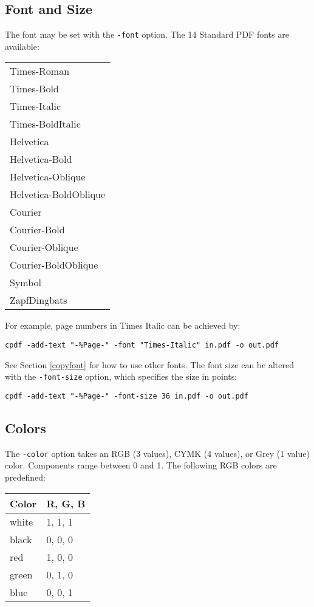 \documentclass{book}
\begin{document}
  \subsection{Font and Size}
  The font may be set with the \texttt{-font} option. The 14 Standard PDF fonts are available:

  \vspace{2mm}
  \begin{tabular}{l}
  Times-Roman\\
  Times-Bold\\
  Times-Italic\\
  Times-BoldItalic\\
  Helvetica\\
  Helvetica-Bold\\
  Helvetica-Oblique\\
  Helvetica-BoldOblique\\
  Courier\\
  Courier-Bold\\
  Courier-Oblique\\
  Courier-BoldOblique\\
  Symbol\\
  ZapfDingbats
  \end{tabular}
 \vspace{2mm}

  \noindent For example, page numbers in Times Italic can be achieved by:
  \begin{framed}
    \small\verb!cpdf -add-text "-%Page-" -font "Times-Italic" in.pdf -o out.pdf!
  \end{framed}
  \noindent See Section \ref{copyfont} for how to use other fonts. The font size can be altered with the \texttt{-font-size} option, which
specifies the size in points:
  \begin{framed}
    \small\verb!cpdf -add-text "-%Page-" -font-size 36 in.pdf -o out.pdf!
  \end{framed}

  \subsection{Colors}
  The \texttt{-color} option takes an RGB (3 values), CYMK (4 values), or Grey (1 value) color. Components range between 0 and 1. The following RGB colors are predefined:

  \vspace{2mm}
  \begin{tabular}{ll}
    \textbf{Color} & \textbf{R, G, B} \\ \hline
     white & 1, 1, 1\\
     black & 0, 0, 0\\
     red & 1, 0, 0\\
     green & 0, 1, 0\\
     blue & 0, 0, 1\\
  \end{tabular}
\end{document}
